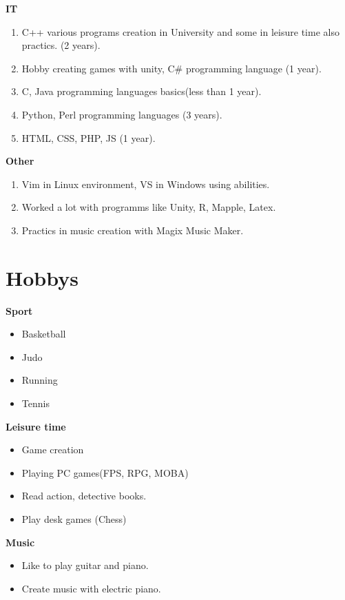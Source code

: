 \documentclass[a4paper,12pt]{article}
\begin{document}
\textbf{IT}
\begin{enumerate}
	\item C++ various programs creation in University and some in leisure time also practics. (2 years).
	\item Hobby creating games with unity, C\# programming language (1 year).
	\item C, Java programming languages basics(less than 1 year).
	\item Python, Perl programming languages (3 years).
	\item HTML, CSS, PHP, JS (1 year).
\end{enumerate}

\textbf{Other}
\begin{enumerate}
	\item Vim in Linux environment, VS in Windows using abilities.
	\item Worked a lot with programms like Unity, R, Mapple, Latex.
	\item Practics in music creation with Magix Music Maker.
\end{enumerate}

\clearpage

\section{Hobbys}
\textbf{Sport}
\begin{itemize}
	\item Basketball
	\item Judo
	\item Running
	\item Tennis
\end{itemize}

\textbf{Leisure time}
\begin{itemize}
	\item Game creation
	\item Playing PC games(FPS, RPG, MOBA)
	\item Read action, detective books.
	\item Play desk games (Chess)
\end{itemize}

\textbf{Music}
\begin{itemize}
	\item Like to play guitar and piano.
	\item Create music with electric piano.
\end{itemize}
\end{document}
